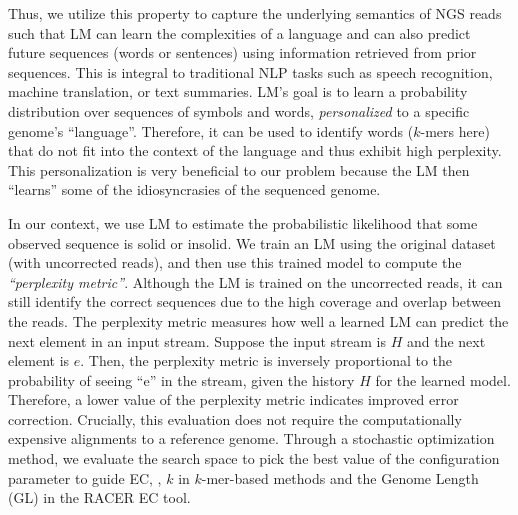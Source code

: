 Thus, we utilize this property to capture the underlying semantics of NGS reads such that LM can learn the complexities of a language and can also predict future sequences (words or sentences) using information retrieved from prior sequences. This is integral to traditional NLP tasks such as speech recognition, machine translation, or text summaries. LM's goal is to learn a probability distribution over sequences of symbols and words, \textit{personalized} to a specific genome's ``language''. Therefore, it can be used to identify words ($k$-mers here) that do not fit into the context of the language and thus exhibit high perplexity. This personalization is very beneficial to our problem because the LM then ``learns'' some of the idiosyncrasies of the sequenced genome.

In our context, we use LM to estimate the probabilistic likelihood that some observed sequence is solid or insolid. We train an LM using the original dataset (with uncorrected reads), and then use this trained model to compute the {\em ``perplexity metric''}. Although the LM is trained on the uncorrected reads, it can still identify the correct sequences due to the high coverage and overlap between the reads. The perplexity metric measures how well a learned LM can predict the next element in an input stream. Suppose the input stream is $H$ and the next element is $e$. Then, the perplexity metric is inversely proportional to the probability of seeing ``e'' in the stream, given the history $H$ for the learned model. 
Therefore, a lower value of the perplexity metric indicates improved error correction. Crucially, this evaluation does not require the computationally expensive alignments to a reference genome.
Through a stochastic optimization method, we evaluate the search space to pick the best value of the configuration parameter to guide EC, \eg, $k$ in $k$-mer-based methods and the Genome Length (GL) in the RACER EC tool. 

